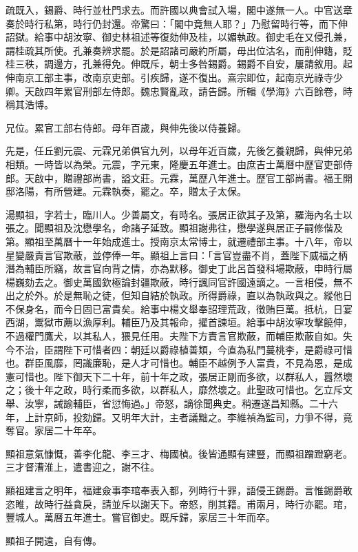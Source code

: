 \begin{pinyinscope}
疏既入，錫爵、時行並杜門求去。而許國以典會試入場，閣中遂無一人。中官送章奏於時行私第，時行仍封還。帝驚曰：「閣中竟無人耶？」乃慰留時行等，而下伸詔獄。給事中胡汝寧、御史林祖述等復劾伸及桂，以媚執政。御史毛在又侵孔兼，謂桂疏其所使。孔兼奏辨求罷。於是詔諸司嚴約所屬，毋出位沽名，而削伸籍，貶桂三秩，調邊方，孔兼得免。伸既斥，朝士多咎錫爵。錫爵不自安，屢請敘用。起伸南京工部主事，改南京吏部。引疾歸，遂不復出。熹宗即位，起南京光祿寺少卿。天啟四年累官刑部左侍郎。魏忠賢亂政，請告歸。所輯《學海》六百餘卷，時稱其浩博。

兄位。累官工部右侍郎。母年百歲，與伸先後以侍養歸。

先是，任丘劉元震、元霖兄弟俱官九列，以母年近百歲，先後乞養親歸，與伸兄弟相類。一時皆以為榮。元震，字元東，隆慶五年進士。由庶吉士萬曆中歷官吏部侍郎。天啟中，贈禮部尚書，謚文莊。元霖，萬歷八年進士。歷官工部尚書。福王開邸洛陽，有所營建。元霖執奏，罷之。卒，贈太子太保。

湯顯祖，字若士，臨川人。少善屬文，有時名。張居正欲其子及第，羅海內名士以張之。聞顯祖及沈懋學名，命諸子延致。顯祖謝弗往，懋學遂與居正子嗣修偕及第。顯祖至萬曆十一年始成進士。授南京太常博士，就遷禮部主事。十八年，帝以星變嚴責言官欺蔽，並停俸一年。顯祖上言曰：「言官豈盡不肖，蓋陛下威福之柄潛為輔臣所竊，故言官向背之情，亦為默移。御史丁此呂首發科場欺蔽，申時行屬楊巍劾去之。御史萬國欽極論封疆欺蔽，時行諷同官許國遠謫之。一言相侵，無不出之於外。於是無恥之徒，但知自結於執政。所得爵祿，直以為執政與之。縱他日不保身名，而今日固已富貴矣。給事中楊文舉奉詔理荒政，徵賄巨萬。抵杭，日宴西湖，鬻獄市薦以漁厚利。輔臣乃及其報命，擢首諫垣。給事中胡汝寧攻擊饒伸，不過權門鷹犬，以其私人，猥見任用。夫陛下方責言官欺蔽，而輔臣欺蔽自如。失今不治，臣謂陛下可惜者四：朝廷以爵祿植善類，今直為私門蔓桃李，是爵祿可惜也。群臣風靡，罔識廉恥，是人才可惜也。輔臣不越例予人富貴，不見為恩，是成憲可惜也。陛下御天下二十年，前十年之政，張居正剛而多欲，以群私人，囂然壞之；後十年之政，時行柔而多欲，以群私人，靡然壞之。此聖政可惜也。乞立斥文舉、汝寧，誡諭輔臣，省愆悔過。」帝怒，謫徐聞典史。稍遷遂昌知縣。二十六年，上計京師，投劾歸。又明年大計，主者議黜之。李維禎為監司，力爭不得，竟奪官。家居二十年卒。

顯祖意氣慷慨，善李化龍、李三才、梅國楨。後皆通顯有建豎，而顯祖蹭蹬窮老。三才督漕淮上，遣書迎之，謝不往。

顯祖建言之明年，福建僉事李琯奉表入都，列時行十罪，語侵王錫爵。言惟錫爵敢恣睢，故時行益貪戾，請並斥以謝天下。帝怒，削其籍。甫兩月，時行亦罷。琯，豐城人。萬曆五年進士。嘗官御史。既斥歸，家居三十年而卒。

顯祖子開遠，自有傳。


\end{pinyinscope}
